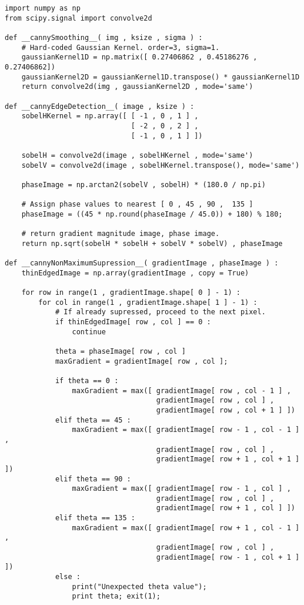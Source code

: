 \begin{lstlisting}[caption=Python implementation details for Canny Edge detection,label=imp:canny-all]
import numpy as np
from scipy.signal import convolve2d

def __cannySmoothing__( img , ksize , sigma ) :
    # Hard-coded Gaussian Kernel. order=3, sigma=1.
    gaussianKernel1D = np.matrix([ 0.27406862 , 0.45186276 , 0.27406862])
    gaussianKernel2D = gaussianKernel1D.transpose() * gaussianKernel1D
    return convolve2d(img , gaussianKernel2D , mode='same')

def __cannyEdgeDetection__( image , ksize ) :
    sobelHKernel = np.array([ [ -1 , 0 , 1 ] ,
                              [ -2 , 0 , 2 ] ,
                              [ -1 , 0 , 1 ] ])

    sobelH = convolve2d(image , sobelHKernel , mode='same')
    sobelV = convolve2d(image , sobelHKernel.transpose(), mode='same')

    phaseImage = np.arctan2(sobelV , sobelH) * (180.0 / np.pi)

    # Assign phase values to nearest [ 0 , 45 , 90 ,  135 ]
    phaseImage = ((45 * np.round(phaseImage / 45.0)) + 180) % 180;

    # return gradient magnitude image, phase image.
    return np.sqrt(sobelH * sobelH + sobelV * sobelV) , phaseImage

def __cannyNonMaximumSupression__( gradientImage , phaseImage ) :
    thinEdgedImage = np.array(gradientImage , copy = True)

    for row in range(1 , gradientImage.shape[ 0 ] - 1) :
        for col in range(1 , gradientImage.shape[ 1 ] - 1) :
            # If already supressed, proceed to the next pixel.
            if thinEdgedImage[ row , col ] == 0 :
                continue

            theta = phaseImage[ row , col ]
            maxGradient = gradientImage[ row , col ];

            if theta == 0 :
                maxGradient = max([ gradientImage[ row , col - 1 ] ,
                                    gradientImage[ row , col ] ,
                                    gradientImage[ row , col + 1 ] ])
            elif theta == 45 :
                maxGradient = max([ gradientImage[ row - 1 , col - 1 ] ,
                                    gradientImage[ row , col ] ,
                                    gradientImage[ row + 1 , col + 1 ] ])
            elif theta == 90 :
                maxGradient = max([ gradientImage[ row - 1 , col ] ,
                                    gradientImage[ row , col ] ,
                                    gradientImage[ row + 1 , col ] ])
            elif theta == 135 :
                maxGradient = max([ gradientImage[ row + 1 , col - 1 ] ,
                                    gradientImage[ row , col ] ,
                                    gradientImage[ row - 1 , col + 1 ] ])
            else :
                print("Unexpected theta value");
                print theta; exit(1);


\end{lstlisting}

